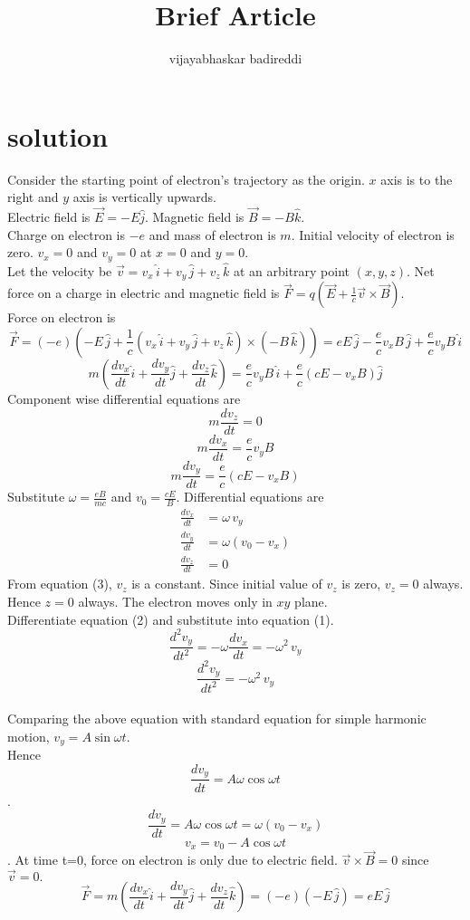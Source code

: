 \documentclass[12pt]{article}
\title{Brief Article}
\author{vijayabhaskar badireddi}
\begin{document}
\section*{solution}
Consider the starting point of electron's trajectory as the origin. $x$ axis is to the right and $y$ axis is vertically upwards.\\
Electric field is $\vec{E}=-E\hat{j}$. Magnetic field is $\vec{B}=-B\hat{k}$.\\
Charge on electron is $-e$ and mass of electron is $m$.
Initial velocity of electron is zero. $v_x=0$ and $v_y=0$ at $x=0$ and $y=0$.\\
Let the velocity be $\vec{v}=v_x\,\hat{i}+v_y\,\hat{j}+v_z\,\hat{k}$ at an arbitrary point $(x,y,z)$.
Net force on a charge in electric and magnetic field is $\vec{F}=q(\vec{E}+\frac{1}{c}\vec{v}\times\vec{B})$.\\
Force on electron is $$\vec{F}=(-e)(-E\,\hat{j}+\frac{1}{c}(v_x\,\hat{i}+v_y\,\hat{j}+v_z\,\hat{k})\times(-B\,\hat{k}))=eE\,\hat{j}-\frac{e}{c}v_xB\,\hat{j}+\frac{e}{c}v_yB\,\hat{i}$$
$$m\left(\frac{dv_x}{dt}\hat{i}+\frac{dv_y}{dt}\hat{j}+\frac{dv_z}{dt}\hat{k} \right )=\frac{e}{c}v_yB\,\hat{i}+\frac{e}{c}(cE-v_xB)\hat{j}$$
Component wise differential equations are 
\[m\frac{dv_z}{dt}=0\]
\[m\frac{dv_x}{dt}=\frac{e}{c}v_yB\]
\[m\frac{dv_y}{dt}=\frac{e}{c}(cE-v_xB)\]
Substitute $\omega=\frac{eB}{mc}$ and $v_0=\frac{cE}{B}$.
Differential equations are 
\begin{align}
\frac{dv_x}{dt}&=\omega\,v_y\\
\frac{dv_y}{dt}&=\omega(v_0-v_x)\\
\frac{dv_z}{dt}&=0
\end{align}
From equation (3),  $v_z$ is a constant. Since initial value of $v_z$ is zero, $v_z=0$ always. Hence $z=0$ always.
The electron moves only in $xy$ plane.\\
Differentiate equation (2) and substitute into equation (1).
$$\frac{d^2v_y}{dt^2}=-\omega\frac{dv_x}{dt}=-\omega^2\,v_y$$
$$\frac{d^2v_y}{dt^2}=-\omega^2\,v_y$$\\
Comparing the above equation with standard equation for simple harmonic motion, $v_y=A\sin{\omega{t}}$.\\
Hence $$\frac{dv_y}{dt}=A\omega\cos{\omega{t}}$$.
$$\frac{dv_y}{dt}=A\omega\cos{\omega{t}}=\omega(v_0-v_x)$$
$$v_x=v_0-A\cos{\omega{t}}$$.
At time t=0, force on electron is only due to electric field. $\vec{v}\times\vec{B}=0$ since $\vec{v}=0.$
$$\vec{F}=m\left(\frac{dv_x}{dt}\hat{i}+\frac{dv_y}{dt}\hat{j}+\frac{dv_z}{dt}\hat{k} \right )=
(-e)(-E\,\hat{j})=eE\,\hat{j}$$
\end{document}
